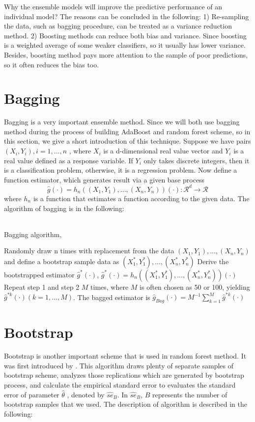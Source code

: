 Why the ensemble models will improve the predictive performance of an individual model? The reasons can be concluded in the following: 1) Re-sampling the data, such as bagging procedure, can be treated as a variance reduction method.\cite{buhlmann2012bagging} 2) Boosting methods can reduce both bias and variance. Since boosting is a weighted average of some weaker classifiers,  so it usually has lower variance. Besides,  boosting method pays more attention to the sample of poor predictions,  so it often reduces the bias too.  
\section{Bagging}
Bagging is a very important ensemble method. Since we will both use bagging method during the process of building AdaBoost and random forest scheme,  so in this section, we give a short introduction of this technique.
Suppose we have pairs $(X_i, Y_i),  i=1, ..., n$ ,  where $X_i$ is a d-dimensional real value vector and $Y_i$ is a real value defined as a response variable.  If $Y_i$ only takes discrete integers,  then it is a classification problem,  otherwise,  it is a regression problem. Now define a function estimator,  which generates result via a given base process \:
\begin{equation}
\hat{g}(\cdot)=h_n((X_1, Y_1), ..., (X_n, Y_n))(\cdot):\mathcal{R}^d\rightarrow \mathcal{R}
\end{equation}  
where $h_n$ is a function that estimates a function according to the given data. 
The algorithm of bagging is in the following:\\
\\
\begin{algorithm}[H]
	\caption{Bagging algorithm, \cite{breiman1996bagging}}\label{alg:bagging}
	\nl Randomly draw n times with replacement from the data $(X_1, Y_1), ..., (X_n, Y_n)$ and define a bootstrap sample data as $(X_1^*, Y_1^*), ..., (X_n^*, Y_n^*)$\;
	\nl Derive the bootstrapped estimator $\hat{g}^*(\cdot)$,  $\hat{g}^*(\cdot)=h_n((X_1^*, Y_1^*), ..., (X_n^*, Y_n^*))(\cdot)$\;
	\nl Repeat step 1 and step 2 $M$ times,  where $M$ is often chosen as 50 or 100,  yielding $\hat{g}^{*k}(\cdot) (k=1, ..., M)$. The bagged estimator is $\hat{g}_{Bag}(\cdot)=M^{-1}\sum_{k=1}^{M}\hat{g}^{*k}(\cdot)$	
\end{algorithm}

\section{Bootstrap}
Bootstrap is another important scheme that is used in random forest method. It was first introduced by  
\cite{efron1979bootstrap}. This algorithm draws plenty of separate samples of bootstrap scheme, analyzes those replications which are generated by  bootstrap process, and calculate the empirical standard error to evaluates the standard error of parameter $\hat{\theta}$ , denoted by $\hat{se}_B$. In $\hat{se}_B$, $B$ represents the number of bootstrap samples that we used. The description of algorithm is described in the following:\\

